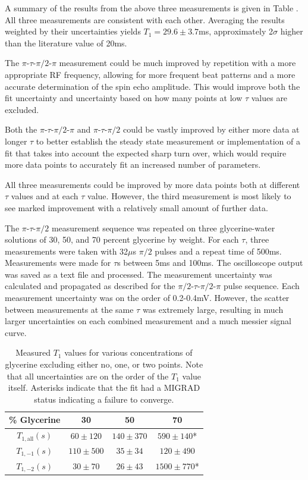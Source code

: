 A summary of the results from the above three measurements is given in Table \label{t:glyc}. All three measurements are consistent with each other. Averaging the results weighted by their uncertainties yields $T_1=29.6\pm3.7$ms, approximately 2$\sigma$ higher than the literature value of 20ms\cite{blo}. 

The $\pi$-$\tau$-$\pi/2$-$\pi$ measurement could be much improved by repetition with a more appropriate RF frequency, allowing for more frequent beat patterns and a more accurate determination of the spin echo amplitude. This would improve both the fit uncertainty and uncertainty based on how many points at low $\tau$ values are excluded.

Both the $\pi$-$\tau$-$\pi/2$-$\pi$ and $\pi$-$\tau$-$\pi/2$ could be vastly improved by either more data at longer $\tau$ to better establish the steady state measurement or implementation of a fit that takes into account the expected sharp turn over, which would require more data points to accurately fit an increased number of parameters. 

All three measurements could be improved by more data points both at different $\tau$ values and at each $\tau$ value. However, the third measurement is most likely to see marked improvement with a relatively small amount of further data.

The $\pi$-$\tau$-$\pi/2$ measurement sequence was repeated on three glycerine-water solutions of 30, 50, and 70 percent glycerine by weight. For each $\tau$, three measurements were taken with 32$\mu$s $\pi/2$ pulses and a repeat time of 500ms. Measurements were made for $\tau$s between 5ms and 100ms. The oscilloscope output was saved as a text file and processed. The measurement uncertainty was calculated and propagated as described for the $\pi/2$-$\tau$-$\pi/2$-$\pi$ pulse sequence. Each measurement uncertainty was on the order of 0.2-0.4mV. However, the scatter between measurements at the same $\tau$ was extremely large, resulting in much larger uncertainties on each combined measurement and a much messier signal curve.

\begin{table}[h]
\caption{\label{t:vis} Measured $T_{1}$ values for various concentrations of glycerine excluding either no, one, or two points. Note that all uncertainties are on the order of the $T_{1}$ value itself. Asterisks indicate that the fit had a MIGRAD status indicating a failure to converge. }
\begin{tabular}{|c|c|c|c|}
\hline
\% Glycerine & 30 & 50 & 70 \\
\hline
$T_{1,\mathrm{all}} (s)$ & $60 \pm 120$ & $140 \pm 370$ & $590 \pm 140$* \\
\hline
$T_{1,-1} (s)$                & $110 \pm 500$ & $35 \pm 34$ & $120 \pm 490$ \\
\hline
$T_{1,-2} (s)$                & $30 \pm 70$ & $26 \pm 43$ & $ 1500 \pm 770$* \\
\hline
\end{tabular}
\end{table}

